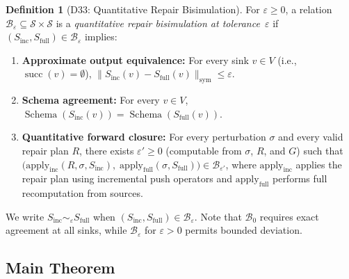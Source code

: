\documentclass[11pt,a4paper]{article}
\theoremstyle{definition}
\newtheorem{definition}[theorem]{Definition}
\DeclareMathOperator{\succ}{succ}
\DeclareMathOperator{\Schema}{Schema}
\begin{document}
\begin{definition}[D33: Quantitative Repair Bisimulation]\label{def:bisimulation}
For $\varepsilon \geq 0$, a relation
$\mathcal{B}_\varepsilon \subseteq \mathcal{S} \times \mathcal{S}$ is a
\emph{quantitative repair bisimulation at tolerance~$\varepsilon$} if
$(S_{\mathrm{inc}}, S_{\mathrm{full}}) \in \mathcal{B}_\varepsilon$ implies:
\begin{enumerate}[nosep]
  \item \textbf{Approximate output equivalence:}
    For every sink $v \in V$ (i.e., $\succ(v) = \emptyset$),
    $\|S_{\mathrm{inc}}(v) - S_{\mathrm{full}}(v)\|_{\mathrm{sym}}
    \leq \varepsilon$.
  \item \textbf{Schema agreement:}
    For every $v \in V$,
    $\Schema(S_{\mathrm{inc}}(v)) = \Schema(S_{\mathrm{full}}(v))$.
  \item \textbf{Quantitative forward closure:}
    For every perturbation $\sigma$ and every valid repair plan $R$,
    there exists $\varepsilon' \geq 0$ (computable from $\sigma$, $R$, and $G$)
    such that
    $\bigl(\mathrm{apply}_{\mathrm{inc}}(R, \sigma, S_{\mathrm{inc}}),\;
           \mathrm{apply}_{\mathrm{full}}(\sigma, S_{\mathrm{full}})\bigr)
    \in \mathcal{B}_{\varepsilon'}$,
    where $\mathrm{apply}_{\mathrm{inc}}$ applies the repair plan using
    incremental push operators and $\mathrm{apply}_{\mathrm{full}}$ performs
    full recomputation from sources.
\end{enumerate}
We write $S_{\mathrm{inc}} \sim_{\varepsilon} S_{\mathrm{full}}$ when
$(S_{\mathrm{inc}}, S_{\mathrm{full}}) \in \mathcal{B}_\varepsilon$.
Note that $\mathcal{B}_0$ requires exact agreement at all sinks, while
$\mathcal{B}_\varepsilon$ for $\varepsilon > 0$ permits bounded deviation.
\end{definition}

\subsection{Main Theorem}
\end{document}
